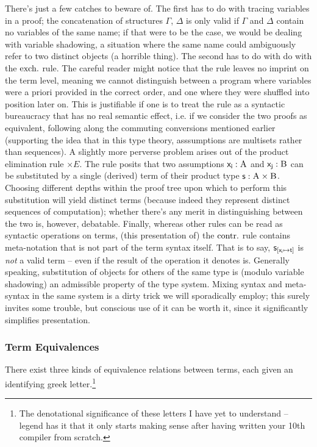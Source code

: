 There's just a few catches to beware of.
The first has to do with tracing variables in a proof; the concatenation of structures $\Gamma$, $\Delta$ is only valid if $\Gamma$ and $\Delta$ contain no variables of the same name; if that were to be the case, we would be dealing with variable shadowing, a situation where the same name could ambiguously refer to two distinct objects (a horrible thing).
The second has to do with do with the $\mathrm{exch.}{}$ rule. 
The careful reader might notice that the rule leaves no imprint on the term level, meaning we cannot distinguish between a program where variables were a priori provided in the correct order, and one where they were shuffled into position later on.
This is justifiable if one is to treat the rule as a syntactic bureaucracy that has no real semantic effect, i.e. if we consider the two proofs as equivalent, following along the commuting conversions mentioned earlier (supporting the idea that in this type theory, asssumptions are multisets rather than sequences).
A slightly more perverse problem arises out of the product elimination rule $\times E$.
The rule posits that two assumptions $\smallterm{x_i}: \smallprop{A}$ and $\smallterm{x_j}: \smallprop{B}$ can be substituted by a single (derived) term of their product type $\smallterm{s}: \smallprop{A}\times\smallprop{B}$. 
Choosing different depths within the proof tree upon which to perform this substitution will yield distinct terms (because indeed they represent distinct sequences of computation); whether there's any merit in distinguishing between the two is, however, debatable.
Finally, whereas other rules can be read as syntactic operations on terms, (this presentation of) the $\mathrm{contr.}{}$ rule contains meta-notation that is not part of the term syntax itself.
That is to say, $\mathsf{s}_{[\mathsf{x_i} \mapsto \mathsf{t}]}$ is \textit{not} a valid term -- even if the result of the operation it denotes is.
Generally speaking, substitution of objects for others of the same type is (modulo variable shadowing) an admissible property of the type system.
Mixing syntax and meta-syntax in the same system is a dirty trick we will sporadically employ; this surely invites some trouble, but conscious use of it can be worth it, since it significantly simplifies presentation.

\subsubsection{Term Equivalences}
There exist three kinds of equivalence relations between terms, each given an identifying greek letter.\footnote{The denotational significance of these letters I have yet to understand -- legend has it that it only starts making sense after having written your 10th compiler from scratch.}

